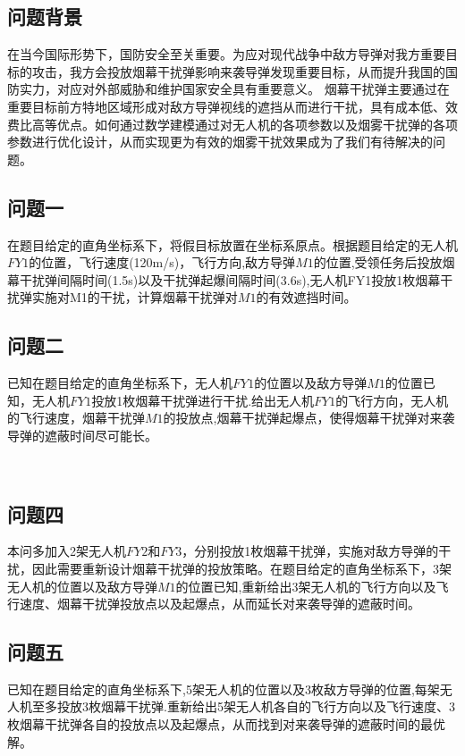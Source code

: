 \documentclass[../main.tex]{subfiles}
\begin{document}
\subsection{问题背景}
\par 在当今国际形势下，国防安全至关重要。为应对现代战争中敌方导弹对我方重要目标的攻击，我方会投放烟幕干扰弹影响来袭导弹发现重要目标，从而提升我国的国防实力，对应对外部威胁和维护国家安全具有重要意义。 烟幕干扰弹主要通过在重要目标前方特地区域形成对敌方导弹视线的遮挡从而进行干扰，具有成本低、效费比高等优点。如何通过数学建模通过对无人机的各项参数以及烟雾干扰弹的各项参数进行优化设计，从而实现更为有效的烟雾干扰效果成为了我们有待解决的问题。



\subsection{问题一}
\par 在题目给定的直角坐标系下，将假目标放置在坐标系原点。根据题目给定的无人机$FY1$的位置，飞行速度(120m/s)，飞行方向,敌方导弹$M1$的位置,受领任务后投放烟幕干扰弹间隔时间(1.5s)以及干扰弹起爆间隔时间(3.6s),无人机FY1投放1枚烟幕干扰弹实施对M1的干扰，计算烟幕干扰弹对$M1$的有效遮挡时间。



\subsection{问题二}
\par 已知在题目给定的直角坐标系下，无人机$FY1$的位置以及敌方导弹$M1$的位置已知，无人机$FY1$投放1枚烟幕干扰弹进行干扰.给出无人机$FY1$的飞行方向，无人机的飞行速度，烟幕干扰弹$M1$的投放点,烟幕干扰弹起爆点，使得烟幕干扰弹对来袭导弹的遮蔽时间尽可能长。



\
\subsection{问题四}

\par 本问多加入2架无人机$FY2$和$FY3$，分别投放1枚烟幕干扰弹，实施对敌方导弹的干扰，因此需要重新设计烟幕干扰弹的投放策略。在题目给定的直角坐标系下，3架无人机的位置以及敌方导弹$M1$的位置已知,重新给出3架无人机的飞行方向以及飞行速度、烟幕干扰弹投放点以及起爆点，从而延长对来袭导弹的遮蔽时间。



\subsection{问题五}
\par 已知在题目给定的直角坐标系下,5架无人机的位置以及3枚敌方导弹的位置,每架无人机至多投放3枚烟幕干扰弹.重新给出5架无人机各自的飞行方向以及飞行速度、3枚烟幕干扰弹各自的投放点以及起爆点，从而找到对来袭导弹的遮蔽时间的最优解。
\end{document}
